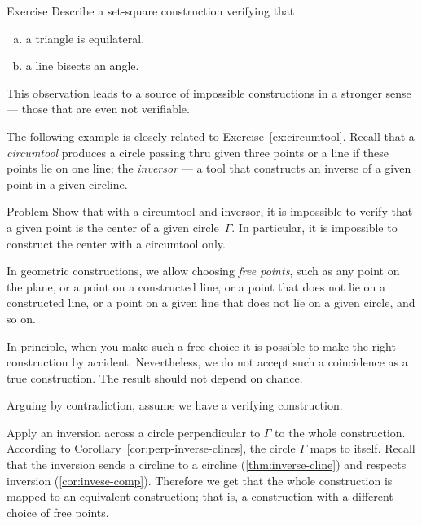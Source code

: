 \begin{thm}{Exercise}\label{ex:equilateral triangle-verify}
Describe a set-square construction verifying that 
\begin{enumerate}[(a)]
\item\label{ex:verify:triangle} a triangle is equilateral.
\item\label{ex:verify:bisector} a line bisects an angle.
\end{enumerate}
\end{thm}

This observation leads to a source of impossible constructions in a stronger sense --- those that are even not verifiable.

The following example is closely related to Exercise~\ref{ex:circumtool}.
Recall that a \emph{circumtool} produces a circle passing thru given three points
or a line if these points lie on one line;
the \emph{inversor} --- a tool that constructs an inverse of a given point in a given circline.


\begin{thm}{Problem}\label{prob:center-inversor+circumtool}
Show that with a circumtool and inversor,
it is impossible to verify that a given point is the center of a given circle~$\Gamma$.
In particular, it is impossible to construct the center with a circumtool only.
\end{thm}

In geometric constructions, we allow choosing \emph{free points}, such as any point on the plane, or a point on a constructed line, or a point that does not lie on a constructed line, or a point on a given line that does not lie on a given circle, and so on.

In principle, when you make such a free choice it is possible to make the right construction by accident.
Nevertheless, we do not accept such a coincidence as a true construction.
The result should not depend on chance.


\label{page:solution-for-ex:circumtool}
Arguing by contradiction, 
assume we have a verifying construction. 

Apply an inversion across a circle perpendicular to $\Gamma$ to the whole construction.
According to Corollary~\ref{cor:perp-inverse-clines},
the circle
$\Gamma$ maps to itself.
Recall that the inversion sends a circline to a circline (\ref{thm:inverse-cline}) and respects inversion (\ref{cor:invese-comp}).
Therefore we get that the whole  construction is mapped to an equivalent construction; 
that is, a construction with a different choice of free points.

